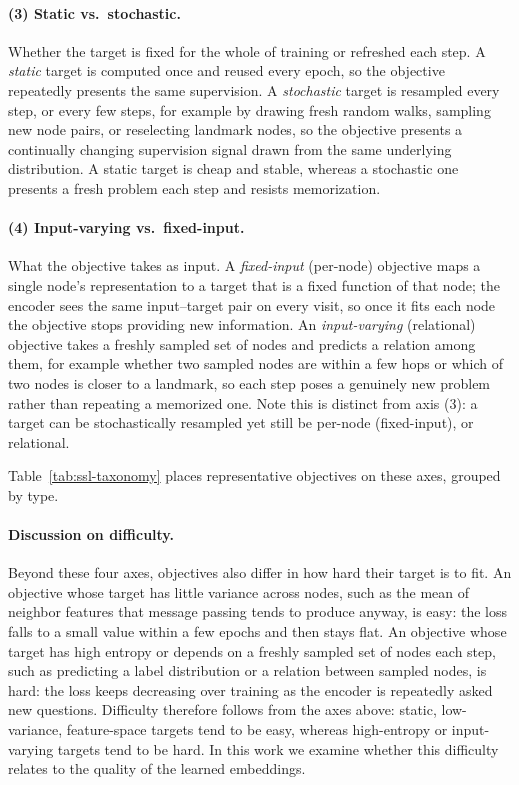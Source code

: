 \paragraph{(3) Static vs.\ stochastic.} Whether the target is fixed for the whole of training or refreshed each step. 
A \emph{static} target is computed once and reused every epoch, so the objective repeatedly presents the same supervision. 
A \emph{stochastic} target is resampled every step, or every few steps, for example by drawing fresh random walks, sampling new node pairs, or reselecting landmark nodes, so the objective presents a continually changing supervision signal drawn from the same underlying distribution.
A static target is cheap and stable, whereas a stochastic one presents a fresh problem each step and resists memorization.

\paragraph{(4) Input-varying vs.\ fixed-input.} What the objective takes as input. A \emph{fixed-input} (per-node) objective maps a single node's representation to a target that is a fixed function of that node; 
the encoder sees the same input--target pair on every visit, so once it fits each node the objective stops providing new information. 
An \emph{input-varying} (relational) objective takes a freshly sampled set of nodes and predicts a relation among them, for example whether two sampled nodes are within a few hops or which of two nodes is closer to a landmark, so each step poses a genuinely new problem rather than repeating a memorized one. 
Note this is distinct from axis (3): a target can be stochastically resampled yet still be per-node (fixed-input), or relational.

Table~\ref{tab:ssl-taxonomy} places representative objectives on these axes, grouped by type.

\paragraph{Discussion on difficulty.} Beyond these four axes, objectives also differ in how hard their target is to fit. An objective whose target has little variance across nodes, such as the mean of neighbor features that message passing tends to produce anyway, is easy: the loss falls to a small value within a few epochs and then stays flat. 
An objective whose target has high entropy or depends on a freshly sampled set of nodes each step, such as predicting a label distribution or a relation between sampled nodes, is hard: the loss keeps decreasing over training as the encoder is repeatedly asked new questions. Difficulty therefore follows from the axes above: static, low-variance, feature-space targets tend to be easy, whereas high-entropy or input-varying targets tend to be hard.
In this work we examine whether this difficulty relates to the quality of the learned embeddings.

